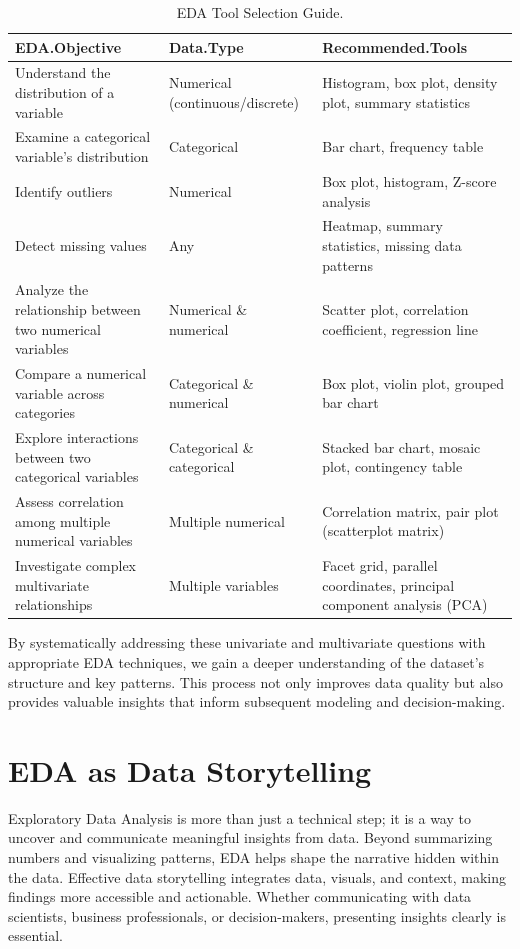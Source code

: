 \documentclass[
  11pt,
]{book}
\theoremstyle{definition}
\theoremstyle{definition}
\theoremstyle{definition}
\theoremstyle{definition}
\theoremstyle{remark}
\begin{document}
\begin{table}

\caption{\label{tab:EDA-table-tools}EDA Tool Selection Guide.}
\centering
\begin{tabular}[t]{lll}
\toprule
EDA.Objective & Data.Type & Recommended.Tools\\
\midrule
Understand the distribution of a variable & Numerical (continuous/discrete) & Histogram, box plot, density plot, summary statistics\\
Examine a categorical variable's distribution & Categorical & Bar chart, frequency table\\
Identify outliers & Numerical & Box plot, histogram, Z-score analysis\\
Detect missing values & Any & Heatmap, summary statistics, missing data patterns\\
Analyze the relationship between two numerical variables & Numerical \& numerical & Scatter plot, correlation coefficient, regression line\\
\addlinespace
Compare a numerical variable across categories & Categorical \& numerical & Box plot, violin plot, grouped bar chart\\
Explore interactions between two categorical variables & Categorical \& categorical & Stacked bar chart, mosaic plot, contingency table\\
Assess correlation among multiple numerical variables & Multiple numerical & Correlation matrix, pair plot (scatterplot matrix)\\
Investigate complex multivariate relationships & Multiple variables & Facet grid, parallel coordinates, principal component analysis (PCA)\\
\bottomrule
\end{tabular}
\end{table}

By systematically addressing these univariate and multivariate questions with appropriate EDA techniques, we gain a deeper understanding of the dataset's structure and key patterns. This process not only improves data quality but also provides valuable insights that inform subsequent modeling and decision-making.

\section{EDA as Data Storytelling}\label{eda-as-data-storytelling}

Exploratory Data Analysis is more than just a technical step; it is a way to uncover and communicate meaningful insights from data. Beyond summarizing numbers and visualizing patterns, EDA helps shape the narrative hidden within the data. Effective data storytelling integrates data, visuals, and context, making findings more accessible and actionable. Whether communicating with data scientists, business professionals, or decision-makers, presenting insights clearly is essential.
\end{document}
